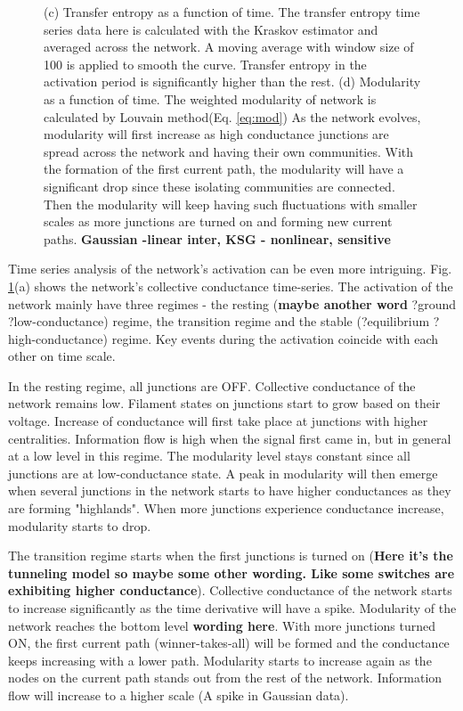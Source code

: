 \documentclass[%
 reprint,
 amsmath,amssymb,
 aps,
floatfix,
]{revtex4-2}
\begin{document}
\begin{figure}
{			\newline (c) Transfer entropy as a function of time. The transfer entropy time series data here is calculated with the Kraskov estimator and averaged across the network. A moving average with window size of 100 is applied to smooth the curve. Transfer entropy in the activation period is significantly higher than the rest.
			\newline (d) Modularity as a function of time. The weighted modularity of network is calculated by Louvain method(Eq. \ref{eq:mod}) As the network evolves, modularity will first increase as high conductance junctions are spread across the network and having their own communities. With the formation of the first current path, the modularity will have a significant drop since these isolating communities are connected. Then the modularity will keep having such fluctuations with smaller scales as more junctions are turned on and forming new current paths.
			\textbf{Gaussian -linear inter, KSG - nonlinear, sensitive}}
	\label{fig:time_series}
\end{figure}

Time series analysis of the network's activation can be even more intriguing. Fig. \ref{fig:time_series}(a) shows the network's collective conductance time-series. The activation of the network mainly have three regimes - the resting (\textbf{maybe another word} ?ground ?low-conductance) regime, the transition regime and the stable (?equilibrium ?high-conductance) regime. Key events during the activation coincide with each other on time scale. 

In the resting regime, all junctions are OFF. Collective conductance of the network remains low. Filament states on junctions start to grow based on their voltage. Increase of conductance will first take place at junctions with higher centralities. Information flow is high when the signal first came in, but in general at a low level in this regime. The modularity level stays constant since all junctions are at low-conductance state. A peak in modularity will then emerge when several junctions in the network starts to have higher conductances as they are forming "highlands". When more junctions experience conductance increase, modularity starts to drop.

The transition regime starts when the first junctions is turned on (\textbf{Here it's the tunneling model so maybe some other wording. Like some switches are exhibiting higher conductance}). Collective conductance of the network starts to increase significantly as the time derivative will have a spike. Modularity of the network reaches the bottom level \textbf{wording here}. With more junctions turned ON, the first current path (winner-takes-all) will be formed and the conductance keeps increasing with a lower path. Modularity starts to increase again as the nodes on the current path stands out from the rest of the network. Information flow will increase to a higher scale (A spike in Gaussian data). 
\end{document}

